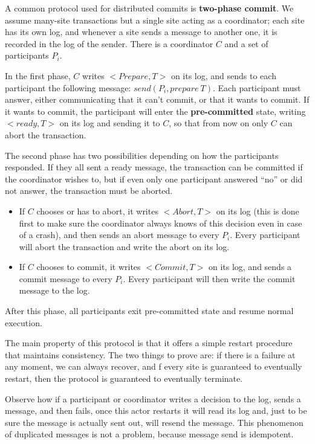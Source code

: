 A common protocol used for distributed commits is \textbf{two-phase commit}. We assume many-site transactions but a single site acting as a coordinator; each site has its own log, and whenever a site sends a message to another one, it is recorded in the log of the sender. There is a coordinator $C$ and a set of participants $P_i$.

In the first phase, $C$ writes $<\textit{Prepare}, T>$ on its log, and sends to each participant the following message: $\textit{send}(P_i, \textit{prepare} \ T)$. Each participant must answer, either communicating that it can't commit, or that it wants to commit. If it wants to commit, the participant will enter the \textbf{pre-committed} state, writing $<\textit{ready}, T>$ on its log and sending it to $C$, so that from now on only $C$ can abort the transaction.

The second phase has two possibilities depending on how the participants responded. If they all sent a ready message, the transaction can be committed if the coordinator wishes to, but if even only one participant answered ``no'' or did not answer, the transaction must be aborted.
\begin{itemize}
    \item If $C$ chooses or has to abort, it writes $<\textit{Abort}, T>$ on its log (this is done first to make sure the coordinator always knows of this decision even in case of a crash), and then sends an abort message to every $P_i$. Every participant will abort the transaction and write the abort on its log.

    \item If $C$ chooses to commit, it writes $<\textit{Commit}, T>$ on its log, and sends a commit message to every $P_i$. Every participant will then write the commit message to the log.
\end{itemize}
After this phase, all participants exit pre-committed state and resume normal execution.

The main property of this protocol is that it offers a simple restart procedure that maintains consistency. The two things to prove are: if there is a failure at any moment, we can always recover, and f every site is guaranteed to eventually restart, then the protocol is guaranteed to eventually terminate.

Observe how if a participant or coordinator writes a decision to the log, sends a message, and then fails, once this actor restarts it will read its log and, just to be sure the message is actually sent out, will resend the message. This phenomenon of duplicated messages is not a problem, because message send is idempotent.

